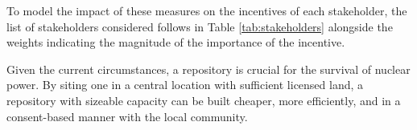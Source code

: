 To model the impact of these measures on the incentives of each stakeholder, 
the list of stakeholders considered follows in Table \ref{tab:stakeholders} 
alongside the weights indicating the magnitude of the importance of the incentive.
 
\begin{table}[h]

\centering
\caption {Metrics and Weight for Each Stakeholder}
\end{table}
Given the current circumstances, a repository is crucial for the survival of nuclear
power. By siting one in a central location with sufficient licensed land,
a repository with sizeable capacity can be built cheaper, more efficiently, and 
in a consent-based manner with the local community. 
